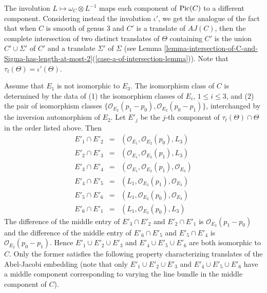 \documentclass[12pt]{amsart}
\numberwithin{equation}{subsection}
\theoremstyle{plain}
\theoremstyle{definition}
\newcommand{\StructureSheaf}[1]{{\mathcal O}_{#1}}
\newcommand{\Pic}{{\rm Pic}}
\begin{document}
{The involution $L\mapsto \omega_C\otimes L^{-1}$ maps each component of $\Pic(C)$ to a different component. Considering instead the involution $\iota'$, we get the analogue of the fact that when $C$ is smooth of genus 3 and $C'$ is a translate of $AJ(C)$, then the complete intersection of two
distinct translates of $\Theta$ containing $C'$ is  
the union $C'\cup\Sigma'$ of $C'$ and a translate $\Sigma'$ of $\Sigma$
(see Lemma \ref{lemma-intersection-of-C-and-Sigma-has-length-at-most-2}(\ref{case-a-of-intersection-lemma})). Note that $\tau_t(\Theta)=\iota'(\Theta)$.

Assume that $E_1$ is not isomorphic to $E_3$.
The isomorphism class of $C$ is determined by the data of (1) the isomorphism classes of $E_i$, $1\leq i\leq 3$, and (2) the pair of isomorphism classes $\{\StructureSheaf{E_2}(p_1-p_0),\StructureSheaf{E_2}(p_0-p_1)\}$, interchanged by the inversion automorphism of $E_2$. Let $E'_j$ be the $j$-th component of $\tau_t(\Theta)\cap \Theta$ in the order listed above. Then 
\begin{eqnarray*}
E'_1\cap E'_2&=&(\StructureSheaf{E_1},\StructureSheaf{E_2}(p_0),L_3)
\\
E'_2\cap E'_3&=&(\StructureSheaf{E_1},\StructureSheaf{E_2}(p_1),L_3)
\\
E'_3\cap E'_4&=&(\StructureSheaf{E_1},\StructureSheaf{E_2}(p_1),\StructureSheaf{E_3})
\\
E'_4\cap E'_5&=&(L_1,\StructureSheaf{E_2}(p_1),\StructureSheaf{E_3})
\\
E'_5\cap E'_6&=&(L_1,\StructureSheaf{E_2}(p_0),\StructureSheaf{E_3})
\\
E'_6\cap E'_1&=&(L_1,\StructureSheaf{E_2}(p_0),L_3)
\end{eqnarray*}
The difference of the middle entry of $E'_3\cap E'_2$ and $E'_2\cap E'_1$ is $\StructureSheaf{E_2}(p_1-p_0)$ and 
the difference of the middle entry of $E'_6\cap E'_5$ and $E'_5\cap E'_4$ is $\StructureSheaf{E_2}(p_0-p_1)$. 
Hence $E'_1\cup E'_2\cup E'_3$ and $E'_4\cup E'_5\cup E'_6$  are both isomorphic to $C$. 
Only the former satisfies the following property characterizing translates of the Abel-Jacobi embedding (note that 
only $E'_1\cup E'_2\cup E'_3$ and $E'_4\cup E'_5\cup E'_6$
have a middle component corresponding to varying the line bundle in the middle component of $C$). 

}
\end{document}
